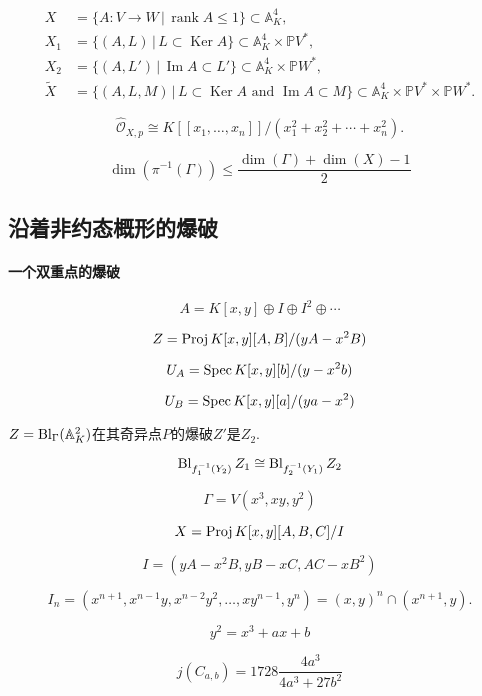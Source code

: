 \[
	\begin{aligned}
		X&=\{A:V\to W\,|\,\operatorname{rank}A\leq 1\}\subset \mathbb A_K^4,\\
		X_1&=\{(A,L)\,|\,L\subset \operatorname{Ker}A\}\subset \mathbb A_K^4\times \mathbb PV^*,\\
		X_2&=\{(A,L')\,|\,\operatorname{Im}A\subset L'\}\subset \mathbb A_K^4\times \mathbb PW^*,\\
		\tilde X&=\{(A,L,M)\,|\, L\subset \operatorname{Ker}A\text{ and }\operatorname{Im}A\subset M\}\subset \mathbb A_K^4\times \mathbb PV^*\times \mathbb PW^*.
	\end{aligned}
\]

\[
	\hat{\mathscr O}_{X,p}\cong K[\![x_1,\dots,x_n]\!]/(x_1^2+x_2^2+\cdots+x_n^2).
\]

\[
	\dim (\pi^{-1}(\Gamma))\leq \frac{\dim(\Gamma)+\dim(X)-1}2
\]

\subsection{沿着非约态概形的爆破}\label{s:4.2.3}

\paragraph*{一个双重点的爆破}

\[
	A=K[x,y]\oplus I\oplus I^2\oplus \cdots
\]

\[
	Z=\operatorname{Proj} K[x,y][A,B]/(yA-x^2B)
\]

\[
	U_A=\operatorname{Spec} K[x,y][b]/(y-x^2b)
\]

\[
	U_B=\operatorname{Spec} K[x,y][a]/(ya-x^2)
\]

\begin{pro}\label{pro:4.40}
	$Z=\operatorname{Bl}_\Gamma(\mathbb A_K^2)$在其奇异点$P$的爆破$Z'$是$Z_2$.
\end{pro}


\[
	\operatorname{Bl}_{f_1^{-1}(Y_2)}Z_1 \cong \operatorname{Bl}_{f_2^{-1}(Y_1)}Z_2
\]

\[
	\Gamma=V(x^3,xy,y^2)
\]

\[
	X=\operatorname{Proj} K[x,y][A,B,C]/I
\]

\[
	I=(yA-x^2B,yB-xC,AC-xB^2)
\]

\[
	I_n=(x^{n+1},x^{n-1}y,x^{n-2}y^2,\dots,xy^{n-1},y^n)=
	(x,y)^n\cap (x^{n+1},y).
\]

\[
	y^2=x^3+ax+b
\]

\[
	j(C_{a,b})=1728\frac{4a^3}{4a^3+27b^2}
\]

